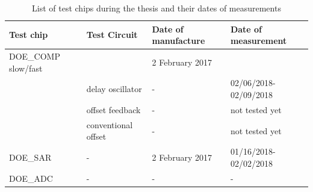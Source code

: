 \begin{table}[htp]
    \caption{List of test chips during the thesis and their dates of measurements}
    \label{tbl:test-chip-list-and-dates}
    \begin{tabular}{@{}llll@{}}
    \toprule
    Test chip           & Test Circuit        & Date of manufacture & Date of measurement   \\ \midrule
    DOE\_COMP slow/fast &                     & 2 February 2017     &                       \\
                        & delay oscillator    & -                   & 02/06/2018-02/09/2018 \\
                        & offset feedback     & -                   & not tested yet        \\
                        & conventional offset & -                   & not tested yet        \\
    DOE\_SAR            & -                   & 2 February 2017     & 01/16/2018-02/02/2018 \\
    DOE\_ADC            & -                   & -                   & -                     \\ \bottomrule
    \end{tabular}
\end{table}

